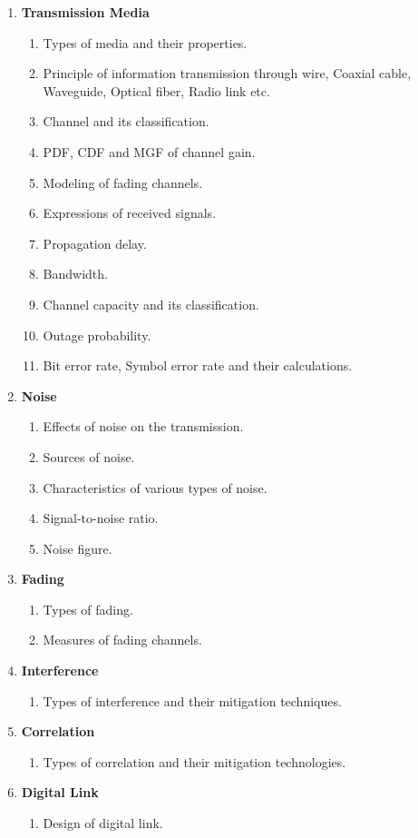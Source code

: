 \documentclass[a4paper,12pt]{article}
\begin{document}
\begin{enumerate}[leftmargin=*, align=left]
		\item \textbf{Transmission Media}
		\begin{enumerate}[label*=\arabic*.]
			\item Types of media and their properties.
			\item Principle of information transmission through wire, Coaxial cable, Waveguide, Optical fiber, Radio link etc.
			\item Channel and its classification.
			\item PDF, CDF and MGF of channel gain.
			\item Modeling of fading channels.
			\item Expressions of received signals.
			\item Propagation delay.
			\item Bandwidth.
			\item Channel capacity and its classification.
			\item Outage probability.
			\item Bit error rate, Symbol error rate and their calculations.
		\end{enumerate}
		
		\item \textbf{Noise}
		\begin{enumerate}[label*=\arabic*.]
			\item Effects of noise on the transmission.
			\item Sources of noise.
			\item Characteristics of various types of noise.
			\item Signal-to-noise ratio.
			\item Noise figure.
		\end{enumerate}
		
		\item \textbf{Fading}
		\begin{enumerate}[label*=\arabic*.]
			\item Types of fading.
			\item Measures of fading channels.
		\end{enumerate}
		
		\item \textbf{Interference}
		\begin{enumerate}[label*=\arabic*.]
			\item Types of interference and their mitigation techniques.
		\end{enumerate}
		
		\item \textbf{Correlation}
		\begin{enumerate}[label*=\arabic*.]
			\item Types of correlation and their mitigation technologies.
		\end{enumerate}
		\newpage
		\item \textbf{Digital Link}
		\begin{enumerate}[label*=\arabic*.]
			\item Design of digital link.
		\end{enumerate}
		

\end{enumerate}
\end{document}

